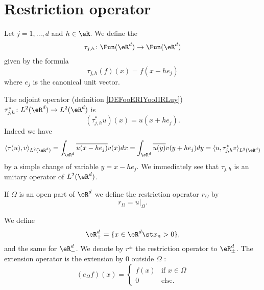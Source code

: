 \section{Restriction operator}

\begin{definition}
    Let \( j=1,\ldots, d\) and \( h\in \eR\). We define the 
    \begin{equation}
        \tau_{j,h}\colon \Fun(\eR^d)\to \Fun(\eR^d)
    \end{equation}
    given by the formula
    \begin{equation}
        \tau_{j,h}(f)(x)=f(x-h e_j)
    \end{equation}
    where \( e_j\) is the canonical unit vector.
\end{definition}

The adjoint operator (definition \ref{DEFooERIYooIIRLuy}) \( \tau^*_{j,h}\colon L^2(\eR^d)\to L^2(\eR^d)\) is 
\begin{equation}
    (\tau^*_{j,h}u)(x)=u(x+he_j).
\end{equation}
Indeed we have
\begin{equation}
    \langle \tau(u), v\rangle_{L^2(\eR^d)}=\int_{\eR^d}\overline{ u(x-he_j) }v(x)dx=\int_{\eR^d}\overline{ u(y) }v(y+he_j)dy=\langle u, \tau^*_{j,h}v\rangle_{L^2(\eR^d)}
\end{equation}
by a simple change of variable \( y=x-he_j\). We immediately see that \( \tau_{j,h}\) is an unitary operator of \( L^2(\eR^d)\).

If \( \Omega\) is an open part of \( \eR^d\) we define the restriction operator \( r_{\Omega}\) by
\begin{equation}
    r_{\Omega}=u|_{\Omega}.
\end{equation}

We define
\begin{equation}
    \eR^d_{+}=\{ x\in \eR^d\st x_n>0 \},
\end{equation}
and the same for \( \eR^d_-\). We denote by \( r^{\pm}\) the restriction operator to \( \eR^d_{\pm}\). The extension operator is the extension by \( 0\) outside \( \Omega\) :
\begin{equation}
    (e_{\Omega}f)(x)=\begin{cases}
        f(x)    &   \text{if } x\in \Omega\\
        0    &    \text{else. }
    \end{cases}
\end{equation}

